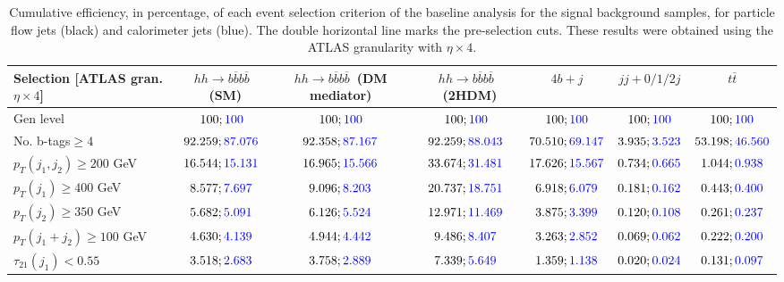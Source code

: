 \begin{landscape}
	\begin{table}
		\centering
		\caption{Cumulative efficiency, in percentage, of each event selection criterion of the baseline analysis for the signal background samples, for particle flow jets (black) and calorimeter jets (blue). The double horizontal line marks the pre-selection cuts. These results were obtained using the ATLAS granularity with $\eta\times 4$.}
		\begin{tabular}{lcccccc}
			\toprule 
			\textbf{Selection [ATLAS gran. $\eta\times 4$]} & $hh\rightarrow b\overline{b}b\overline{b}$~(SM) & $hh\rightarrow b\overline{b}b\overline{b}$~(DM mediator) & $hh\rightarrow b\overline{b}b\overline{b}$~(2HDM) & $4b+j$  & $jj+0/1/2 j$ & $t\overline{t}$ \\
			\midrule
			Gen level & $100;\textcolor{blue}{100}$ & $100;\textcolor{blue}{100}$ &$100;\textcolor{blue}{100}$& $100;\textcolor{blue}{100}$& $100;\textcolor{blue}{100}$& $100;\textcolor{blue}{100}$ \\
			\rowcolor{black!7}No. b-tags$\geq 4$&$92.259;\textcolor{blue}{87.076}$&$92.358;\textcolor{blue}{87.167}$&$92.259;\textcolor{blue}{88.043}$&$70.510;\textcolor{blue}{69.147}$&$3.935;\textcolor{blue}{3.523}$&$53.198;\textcolor{blue}{46.560}$\\
			$p_T(j_1,j_2)\geq200$ GeV & $16.544;\textcolor{blue}{15.131}$ & $16.965;\textcolor{blue}{15.566}$&$33.674;\textcolor{blue}{31.481}$ &$17.626;\textcolor{blue}{15.567}$&$0.734;\textcolor{blue}{0.665}$&$1.044;\textcolor{blue}{0.938}$\\
			\midrule \midrule
			\rowcolor{black!7}$p_T(j_1)\geq 400$ GeV & $8.577;\textcolor{blue}{7.697}$ &$9.096;\textcolor{blue}{8.203}$  &$20.737;\textcolor{blue}{18.751}$&$6.918;\textcolor{blue}{6.079}$&$0.181;\textcolor{blue}{0.162}$&$0.443;\textcolor{blue}{0.400}$\\ 
			$p_T(j_2)\geq 350$ GeV & $5.682;\textcolor{blue}{5.091}$& $6.126;\textcolor{blue}{5.524}$&$12.971;\textcolor{blue}{11.469}$&$3.875;\textcolor{blue}{3.399}$&$0.120;\textcolor{blue}{0.108}$&$0.261;\textcolor{blue}{0.237}$\\
			\rowcolor{black!7}$p_T(j_1+j_2)\geq 100$ GeV &$4.630;\textcolor{blue}{4.139}$ & $4.944;\textcolor{blue}{4.442}$ &$9.486;\textcolor{blue}{8.407}$&$3.263;\textcolor{blue}{2.852}$&$0.069;\textcolor{blue}{0.062}$&$0.222;\textcolor{blue}{0.200}$\\
			$\tau_{21}(j_1)<0.55$ & $3.518;\textcolor{blue}{2.683}$& $3.758;\textcolor{blue}{2.889}$&$7.339;\textcolor{blue}{5.649}$&$1.359;\textcolor{blue}{1.138}$&$0.020;\textcolor{blue}{0.024}$&$0.131;\textcolor{blue}{0.097}$\\

\end{tabular}
\end{table}
\end{landscape}
